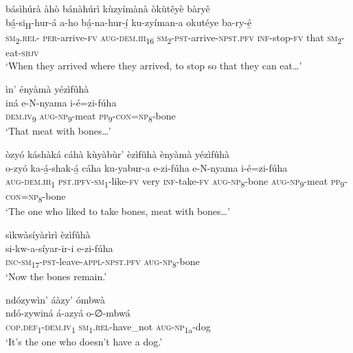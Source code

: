 básìhúrà àhò bánàhúrì kùzyímànà òkùtêyè bàryê\\
\gll bá̲-si\textsubscript{H}{}-hur-á      a-ho      bá̲-na-hur-í̲ ku-zyíman-a    okutéye  ba-ry-é̲\\
\textsc{sm}\textsubscript{2}.\textsc{rel}{}- \textsc{per}{}-arrive-\textsc{fv}  \textsc{aug}{}-\textsc{dem}.\textsc{iii}\textsubscript{16}  \textsc{sm}\textsubscript{2}{}-\textsc{pst}{}-arrive-\textsc{npst}.\textsc{pfv}
\textsc{inf}{}-stop-\textsc{fv}    that    \textsc{sm}\textsubscript{2}{}-eat-\textsc{sbjv} \\
\glt ‘When they arrived where they arrived, to stop so that they can eat…’\bigskip

ìn’ ényàmà yézìfûhà\\
\gll iná    e-N-nyama    i-é=zi-fúha\\
\textsc{dem}.\textsc{iv}\textsubscript{9}  \textsc{aug}{}-\textsc{np}\textsubscript{9}{}-meat  \textsc{pp}\textsubscript{9}{}-\textsc{con}=\textsc{np}\textsubscript{8}{}-bone\\
\glt ‘That meat with bones…’\bigskip

òzyó káshàká cáhà kùyàbùr’ èzìfûhà ènyàmà yézìfûhà\\
\gll o-zyó    ka-á̲-shak-á̲      cáha  ku-yabur-a  e-zi-fúha e-N-nyama    i-é=zi-fúha\\
\textsc{aug}{}-\textsc{dem}.\textsc{iii}\textsubscript{1}  \textsc{pst}.\textsc{ipfv}{}-\textsc{sm}\textsubscript{1}{}-like-\textsc{fv}  very  \textsc{inf}{}-take-\textsc{fv}  \textsc{aug}{}-\textsc{np}\textsubscript{8}{}-bone
\textsc{aug}{}-\textsc{np}\textsubscript{9}{}-meat  \textsc{pp}\textsubscript{9}{}-\textsc{con}=\textsc{np}\textsubscript{8}{}-bone\\
\glt ‘The one who liked to take bones, meat with bones…’\bigskip

sìkwàsíyàrìrì èzìfûhà\\
\gll si-kw-a-síyar-ir-i        e-zi-fúha\\
\textsc{inc}{}-\textsc{sm}\textsubscript{17}{}-\textsc{pst}{}-leave-\textsc{appl}{}-\textsc{npst}.\textsc{pfv}  \textsc{aug}{}-\textsc{np}\textsubscript{8}{}-bone\\
\glt ‘Now the bones remain.’\bigskip

\newpage
ndózywìn’ áàzy’ ómbwà\\
\gll ndó-zywiná    á-azyá      o-∅-mbwá\\
\textsc{cop}.\textsc{def}\textsubscript{1}{}-\textsc{dem}.\textsc{iv}\textsubscript{1}  \textsc{sm}\textsubscript{1}.\textsc{rel}{}-have\_not  \textsc{aug}{}-\textsc{np}\textsubscript{1a}{}-dog\\
\glt ‘It’s the one who doesn’t have a dog.’\bigskip

